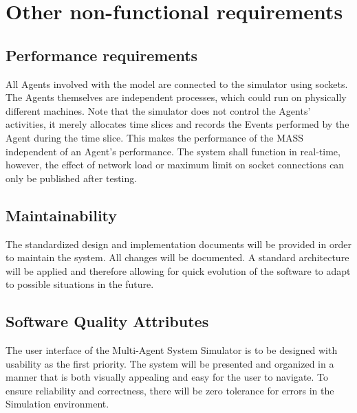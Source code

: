 \chapter{Other non-functional requirements}\label{chapter:otherFunctionalRequirements}

\section{Performance requirements}

All Agents involved with the model are connected to the simulator using sockets. The Agents themselves are independent processes, which could run on physically different machines. Note that the simulator does not control the Agents' activities, it merely allocates time slices and records the Events performed by the Agent during the time slice. This makes the performance of the MASS independent of an Agent's performance. The system shall function in real-time, however, the effect of network load or maximum limit on socket connections can only be published after testing.

\section{Maintainability}

The standardized design and implementation documents will be provided in order to maintain the system. All changes will be documented. A standard architecture will be applied and therefore allowing for quick evolution of the software to adapt to possible situations in the future. 

\section{Software Quality Attributes}

The user interface of the Multi-Agent System Simulator is to be designed with usability as the first priority. The system will be presented and organized in a manner that is both visually appealing and easy for the user to navigate. To ensure reliability and correctness, there will be zero tolerance for errors in the Simulation environment. 


